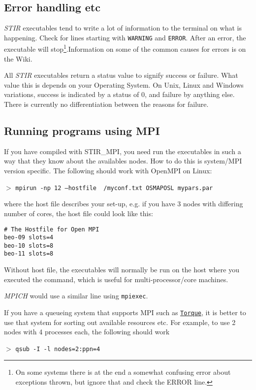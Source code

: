 \documentclass{article}
\def\url#1#2{\mbox{\href{#1}{\tt #2}}}
\newcommand{\cmdline}[1]{\par \noindent $>$ \texttt{#1}\par}
\begin{document}
\subsection{
Error handling etc}
\textit{STIR} executables tend to write a lot of information to the terminal on what is happening.
Check for lines starting with \texttt{WARNING} and \texttt{ERROR}. 
After an error, the executable will stop\footnote{On some systems there is at the end
a somewhat confusing error about
exceptions thrown, but ignore that and check the ERROR line.}.Information on some of the common
causes for errors is on the Wiki.

All \textit{STIR} executables return a status value to signify success 
or failure. What value this is depends on your Operating System. 
On Unix, Linux and Windows variations, success is indicated by 
a status of 0, and failure by anything else. There is currently 
no differentiation between the reasons for failure.

\subsection{
Running programs using MPI \label{sec:RunningWithMPI}}
If you have compiled with STIR\_MPI, you need run the executables in such a way that
they know about the availables nodes. How to do this is system/MPI version specific. The following
should work with OpenMPI on Linux:

\cmdline{mpirun -np 12 --hostfile ~/myconf.txt OSMAPOSL mypars.par}

\noindent 
where the host file describes your set-up, e.g. if you have 3 nodes with differing number of cores, the
host file could look like this:
\begin{verbatim}
# The Hostfile for Open MPI
beo-09 slots=4
beo-10 slots=8
beo-11 slots=8
\end{verbatim}
Without host file, the executables will normally be run on the host where you executed the command, which
is useful for multi-processor/core machines. 

\textit{MPICH} would use a similar line using \texttt{mpiexec}.

If you have a queueing system that supports MPI such as 
\url{http://www.clusterresources.com/products/torque-resource-manager.php}{Torque}, it is better to use 
that system for sorting out available resources etc. For example, to use 2 nodes with 4 processes each,
the following should work

\cmdline{qsub -I -l nodes=2:ppn=4}
\end{document}
